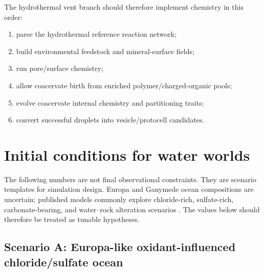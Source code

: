 \documentclass[11pt]{article}
\begin{document}
The hydrothermal vent branch should therefore implement chemistry in this order:
\begin{enumerate}
  \item parse the hydrothermal reference reaction network;
  \item build environmental feedstock and mineral-surface fields;
  \item run pore/surface chemistry;
  \item allow coacervate birth from enriched polymer/charged-organic pools;
  \item evolve coacervate internal chemistry and partitioning traits;
  \item convert successful droplets into vesicle/protocell candidates.
\end{enumerate}

\section{Initial conditions for water worlds}

The following numbers are not final observational constraints. They are scenario templates
for simulation design. Europa and Ganymede ocean compositions are uncertain; published
models commonly explore chloride-rich, sulfate-rich, carbonate-bearing, and water--rock
alteration scenarios \cite{tan2021,thompson2021,nasaEuropa2016,gavinVance2012}. The values
below should therefore be treated as tunable hypotheses.

\subsection{Scenario A: Europa-like oxidant-influenced chloride/sulfate ocean}
\end{document}
